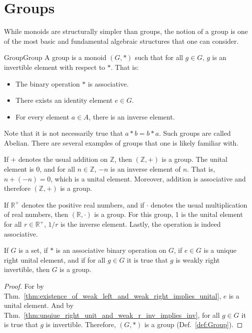 \section{Groups}
    While monoids are structurally simpler than groups, the notion of a group is
    one of the most basic and fundamental algebraic structures that one can
    consider.
    \begin{fdefinition}{Group}{Group}
        A group is a \gls{monoid} $(G,*)$ such that for all $g\in{G}$, $g$ is an
        \gls{invertible element} with respect to $*$. That is:
        \begin{itemize}
            \item The binary operation $*$ is associative.
            \item There exists an identity element $e\in{G}$.
            \item For every element $a\in{A}$, there is an inverse element.
        \end{itemize}
    \end{fdefinition}
    Note that it is not necessarily true that $a*b=b*a$. Such groups are called
    Abelian. There are several examples of groups that one is likely familiar
    with.
    \begin{example}
        If $+$ denotes the usual addition on $\mathbb{Z}$, then
        $(\mathbb{Z},+)$ is a group. The unital element is 0, and for all
        $n\in\mathbb{Z}$, $\minus{n}$ is an inverse element of $n$. That is,
        $n+(\minus{n})=0$, which is a unital element. Moreover, addition is
        associative and therefore $(\mathbb{Z},+)$ is a group.
    \end{example}
    \begin{example}
        If $\mathbb{R}^{+}$ denotes the positive real numbers, and if $\cdot$
        denotes the usual multiplication of real numbers, then
        $(\mathbb{R},\cdot)$ is a group. For this group, 1 is the unital element
        for all $r\in\mathbb{R}^{+}$, $1/r$ is the inverse element. Lastly,
        the operation is indeed associative.
    \end{example}
    \begin{theorem}
        If $G$ is a set, if $*$ is an associative binary operation on $G$, if
        $e\in{G}$ is a unique right unital element, and if for all $g\in{G}$ it
        is true that $g$ is weakly right invertible, then $G$ is a group.
    \end{theorem}
    \begin{proof}
        For by
        Thm.~\ref{thm:existence_of_weak_left_and_weak_right_implies_unital},
        $e$ is a unital element. And by
        Thm.~\ref{thm:unqiue_right_unit_and_weak_r_inv_implies_inv}, for all
        $g\in{G}$ it is true that $g$ is invertible. Therefore, $(G,*)$ is a
        group (Def.~\ref{def:Group}).
    \end{proof}
